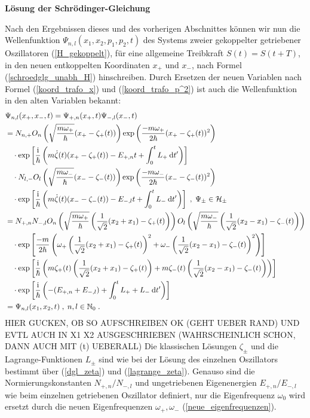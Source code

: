   \textbf{Lösung der Schrödinger-Gleichung}

  Nach den Ergebnissen dieses und des vorherigen Abschnittes können wir nun die Wellenfunktion $\Psi_{n,l}(x_1,x_2,p_1,p_2,t)$ des Systems zweier gekoppelter getriebener Oszillatoren (\ref{H_gekoppelt}), für eine allgemeine Treibkraft $S(t)=S(t+T)$, in den neuen entkoppelten Koordinaten $x_+$ und $x_-$, nach Formel (\ref{schroedglg_unabh_H}) hinschreiben.
  Durch Ersetzen der neuen Variablen nach Formel (\ref{koord_trafo_x}) und (\ref{koord_trafo_p^2}) ist auch die Wellenfunktion in den alten Variablen bekannt:
  \begin{align}
     &\Psi_{n,l}(x_+,x_-,t) = \Psi_{+,n}(x_+,t)\Psi_{-,l}(x_-,t) \notag\\
     &=N_{n,+}O_n\left(\sqrt{\frac{m\omega_+}{\hbar}}(x_+-\zeta_+(t))\right) \exp\left(\frac{-m\omega_+}{2\hbar}(x_+-\zeta_+(t))^2\right)\notag\\
     &\quad \cdot \exp\left[\frac{\text i}{\hbar}\left(m\dot \zeta(t)(x_+-\zeta_+(t))-E_{+,n}t+\int_0^tL_+\:\text dt'\right)\right] \quad\quad\quad\notag\\
     &\quad \cdot N_{l,-}O_l\left(\sqrt{\frac{m\omega_-}{\hbar}}(x_--\zeta_-(t))\right) \exp\left(\frac{-m\omega_-}{2\hbar}(x_--\zeta_-(t))^2\right)\notag\\
     &\quad \cdot \exp\left[\frac{\text i}{\hbar}\left(m\dot \zeta(t)(x_--\zeta_-(t))-E_{-,l}t+\int_0^tL_-\:\text dt'\right)\right] \;,\; \Psi_\pm \in \cal H_\pm \notag\\
    &= N_{+,n}N_{-,l} O_n\left(\sqrt{\frac{m\omega_+}{\hbar}}\left(\frac{1}{\sqrt{2}}(x_2+x_1)-\zeta_+(t)\right)\right)O_l\left(\sqrt{\frac{m\omega_-}{\hbar}}\left(\frac{1}{\sqrt{2}}(x_2-x_1)-\zeta_-(t)\right)\right) \notag\\
    &\quad\cdot \exp\left[\frac{-m}{2\hbar}\left(\omega_+\left(\frac{1}{\sqrt{2}}(x_2+x_1)-\zeta_+(t)\right)^2 + \omega_-\left(\frac{1}{\sqrt{2}}(x_2-x_1)-\zeta_-(t)\right)^2\right)\right] \notag\\
    &\quad\cdot \exp\left[\frac{\text i}{\hbar} \left(m\zeta_+(t)\left(\frac{1}{\sqrt{2}}(x_2+x_1)-\zeta_+(t)\right) + m\zeta_-(t)\left(\frac{1}{\sqrt{2}}(x_2-x_1)-\zeta_-(t)\right)\right) \right] \notag\\
    &\quad\cdot \exp \left[\frac{\text i}{\hbar}\left(-(E_{+,n}+E_{-,l})+\int_0^tL_++L_-\:\text dt'\right)\right] \notag\\
    &=\Psi_{n,l}(x_1,x_2,t) \; , \; n,l \in \mathbb N_0 \; .
  \end{align}
  HIER GUCKEN, OB SO AUFSCHREIBEN OK (GEHT UEBER RAND) UND EVTL AUCH IN X1 X2 AUSGESCHRIEBEN (WAHRSCHEINLICH SCHON, DANN AUCH MIT (t) UEBERALL)
  Die klassischen Lösungen $\zeta_\pm$ und die Lagrange-Funktionen $L_\pm$ sind wie bei der Lösung des einzelnen Oszillators bestimmt über (\ref{dgl_zeta}) und (\ref{lagrange_zeta}).
  Genauso sind die Normierungskonstanten $N_{+,n}/N_{-,l}$ und ungetriebenen Eigenenergien $E_{+,n}/E_{-,l}$ wie beim einzelnen getriebenen Oszillator definiert, nur die Eigenfrequenz $\omega_0$ wird ersetzt durch die neuen Eigenfrequenzen $\omega_+,\omega_-$ (\ref{neue_eigenfrequenzen}).

